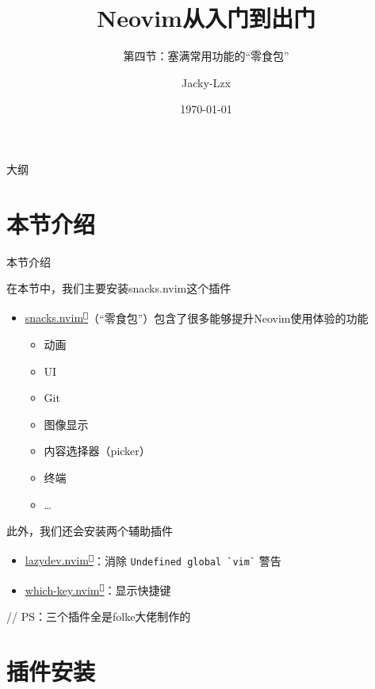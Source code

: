 \documentclass[aspectratio=169]{ctexbeamer}
\title{Neovim从入门到出门}
\subtitle{第四节：塞满常用功能的“零食包”}
\author{Jacky-Lzx}
\date{\today}
\newcommand{\nerd}[1]{\texttt{#1}}
\newcommand{\link}[3][]{\href{#3}{#2\textsuperscript{\nerd{}}}}
\begin{document}
\begin{frame}
  \titlepage
\end{frame}

\begin{frame}{大纲}
  \tableofcontents
\end{frame}

\section{本节介绍}

  \begin{frame}{本节介绍}

    在本节中，我们主要安装snacks.nvim这个插件

    \begin{itemize}
      \item \link{snacks.nvim}{https://github.com/folke/snacks.nvim}（``零食包''）包含了很多能够提升Neovim使用体验的功能
        \begin{itemize}
          \item 动画
          \item UI
          \item Git
          \item 图像显示
          \item 内容选择器（picker）
          \item 终端
          \item \dots
        \end{itemize}
    \end{itemize}

    此外，我们还会安装两个辅助插件
    \begin{itemize}
      \item \link{lazydev.nvim}{https://github.com/folke/lazydev.nvim}：消除 \lstinline[basicstyle={\ttfamily\color[RGB]{249, 226, 175}}]{Undefined global `vim`} 警告
      \item \link{which-key.nvim}{https://github.com/folke/which-key.nvim}：显示快捷键
    \end{itemize}

    {\footnotesize// PS：三个插件全是folke大佬制作的}
  \end{frame}

\section{插件安装}
\end{document}

